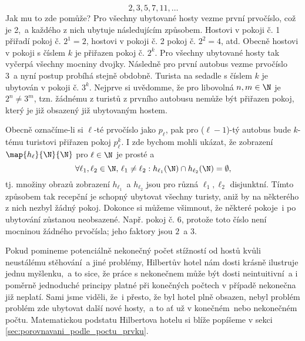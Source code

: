 \begin{enumerate}[label=\textit{(\roman*)}]
    \begin{equation*}
        2,3,5,7,11,\dots
    \end{equation*}
    Jak mu to zde pomůže? Pro všechny ubytované hosty vezme první prvočíslo, což je 2,~a každého z nich ubytuje následujícím způsobem. Hostovi v pokoji č. 1 přiřadí pokoj č. $2^1=2$, hostovi v pokoji č. 2 pokoj č. $2^2=4$, atd. Obecně hostovi v pokoji s číslem $k$ je přiřazen pokoj č. $2^k$. Pro všechny ubytované hosty tak vyčerpá všechny mocniny dvojky. Následně pro první autobus vezme prvočíslo 3~a nyní postup probíhá stejně obdobně. Turista na sedadle s číslem $k$ je ubytován v pokoji č. $3^k$. Nejprve si uvědomme, že pro libovolná $n,m\in\N$ je $2^n\neq 3^m$, tzn. žádnému z turistů z prvního autobusu nemůže být přiřazen pokoj, který je již obsazený již ubytovaným hostem.\par
    Obecně označíme-li si $\ell$-té prvočíslo jako $p_\ell$, pak pro ($\ell-1$)-tý autobus bude $k$-tému turistovi přiřazen pokoj $p_\ell^k$. I zde bychom mohli ukázat, že zobrazení $\map{h_\ell}{\N}{\N}$ pro $\ell\in\N$ je prosté a
    \begin{equation*}
        \forall\ell_1,\ell_2\in\N,\,\ell_1\neq\ell_2: h_{\ell_1}(\N)\cap h_{\ell_2}(\N)=\emptyset,
    \end{equation*}
    tj. množiny obrazů zobrazení $h_{\ell_1}$~a $h_{\ell_2}$ jsou pro různá $\ell_1,\ell_2$ disjunktní. Tímto způsobem tak recepční je schopný ubytovat všechny turisty, aniž by na některého z nich nezbyl žádný pokoj. Dokonce si můžeme všimnout, že některé pokoje~i po ubytování zůstanou neobsazené. Např. pokoj č. 6, protože toto číslo není mocninou žádného prvočísla; jeho faktory jsou $2$~a $3$.
\end{enumerate}
Pokud pomineme potenciálně nekonečný počet stížností od hostů kvůli neustálému stěhování~a jiné problémy, Hilbertův hotel nám dosti krásně ilustruje jednu myšlenku,~a to sice, že práce s nekonečnem může být dosti neintuitivní~a i poměrně jednoduché principy platné při konečných počtech v případě nekonečna již neplatí. Sami jsme viděli, že~i přesto, že byl hotel plně obsazen, nebyl problém problém zde ubytovat další nové hosty,~a to ať už v konečném~nebo nekonečném počtu. Matematickou podstatu Hilbertova hotelu si blíže popíšeme v sekci \ref{sec:porovnavani_podle_poctu_prvku}.